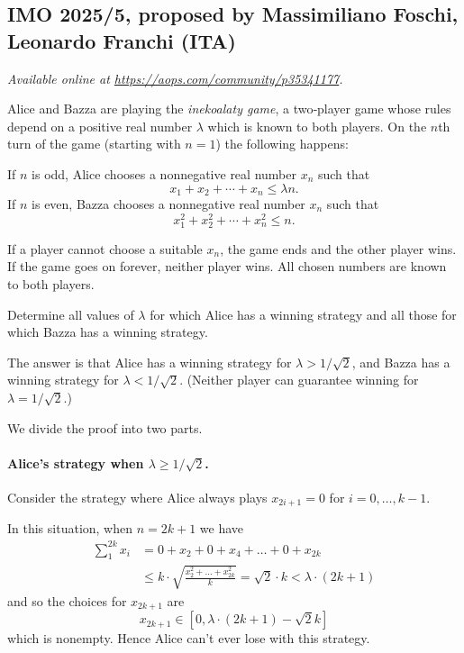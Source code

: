 \documentclass[11pt]{scrartcl}
\begin{document}
\subsection{IMO 2025/5, proposed by Massimiliano Foschi, Leonardo Franchi (ITA)}
\textsl{Available online at \url{https://aops.com/community/p35341177}.}
\begin{mdframed}[style=mdpurplebox,frametitle={Problem statement}]
Alice and Bazza are playing the \emph{inekoalaty game},
a two‑player game whose rules depend on a positive real number $\lambda$ which is known to both players.
On the $n$th turn of the game (starting with $n=1$) the following happens:
\begin{itemize}
  \ii If $n$ is odd, Alice chooses a nonnegative real number $x_n$ such that
  \[ x_1 + x_2 + \cdots + x_n \le \lambda n.  \]
  \ii If $n$ is even, Bazza chooses a nonnegative real number $x_n$ such that
  \[ x_1^2 + x_2^2 + \cdots + x_n^2 \le n.  \]
\end{itemize}
If a player cannot choose a suitable $x_n$, the game ends and the other player wins.
If the game goes on forever, neither player wins.
All chosen numbers are known to both players.

Determine all values of $\lambda$ for which Alice has a winning strategy
and all those for which Bazza has a winning strategy.
\end{mdframed}
The answer is that Alice has a winning strategy for $\lambda > 1/\sqrt2$,
and Bazza has a winning strategy for $\lambda < 1/\sqrt2$.
(Neither player can guarantee winning for $\lambda = 1/\sqrt2$.)

We divide the proof into two parts.

\paragraph{Alice's strategy when $\lambda \ge 1/\sqrt2$.}
Consider the strategy where Alice always plays $x_{2i+1} = 0$ for $i=0, \dots, k-1$.

In this situation, when $n = 2k+1$ we have
\begin{align*}
  \sum_1^{2k} x_i &= 0 + x_2 + 0 + x_4 + \dots + 0 + x_{2k}  \\
  &\le k \cdot \sqrt{\frac{x_2^2 + \dots + x_{2k}^2}{k}}
  = \sqrt{2} \cdot k < \lambda \cdot (2k+1)
\end{align*}
and so the choices for $x_{2k+1}$ are
\[ x_{2k+1} \in [0, \lambda \cdot (2k+1) - \sqrt{2} k] \]
which is nonempty.
Hence Alice can't ever lose with this strategy.
\end{document}
